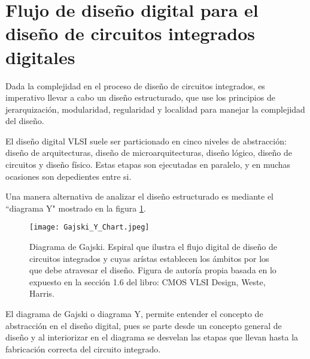 \section{Flujo de diseño digital para el diseño de circuitos integrados digitales}

Dada la complejidad en el proceso de diseño de circuitos integrados, es imperativo llevar a cabo un diseño estructurado, que use los principios de jerarquización, modularidad, regularidad y localidad para manejar la complejidad del diseño.

El diseño digital VLSI suele ser particionado en cinco niveles de abstracción: diseño de arquitecturas, diseño de microarquitecturas, diseño lógico, diseño de circuitos y diseño físico. Estas etapas son ejecutadas en paralelo, y en muchas ocasiones son depedientes entre si.

Una manera alternativa de analizar el diseño estructurado es mediante el ``diagrama Y" mostrado en la figura \ref{Ychart}. 

\begin{figure}[h]
\texttt{[image: Gajski\_Y\_Chart.jpeg]}
\centering
\caption{Diagrama de Gajski. Espiral que ilustra el flujo digital de diseño de circuitos integrados y cuyas arístas establecen los ámbitos por los que debe atravesar el diseño. Figura de autoría propia basada en lo expuesto en la sección 1.6 del libro: CMOS VLSI Design, Weste, Harris.}
\label{Ychart}
\end{figure}


El diagrama de Gajski o diagrama Y, permite entender el concepto de abstracción en el diseño digital, pues se parte desde un concepto general de diseño y al interiorizar en el diagrama se desvelan las etapas que llevan hasta la fabricación correcta del circuito integrado.


